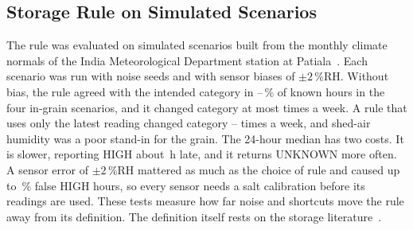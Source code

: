 \subsection{Storage Rule on Simulated Scenarios}
\label{sec:results-storage}

The rule was evaluated on  simulated scenarios built from the monthly climate normals of the India Meteorological
Department station at Patiala~\cite{imd2022}. Each scenario was run with  noise seeds and with sensor biases of
$\pm2$\,\%RH. Without bias, the rule agreed with the intended category in --\,\% of known
hours in the four in-grain scenarios, and it changed category at most  times a week. A rule that uses only the
latest reading changed category -- times a week, and shed-air humidity was a poor
stand-in for the grain. The 24-hour median has two costs. It is slower, reporting HIGH about \,h late, and it
returns UNKNOWN more often. A sensor error of $\pm2$\,\%RH mattered as much as the choice of rule and caused up to
\,\% false HIGH hours, so every sensor needs a salt calibration before its readings are used. These
tests measure how far noise and shortcuts move the rule away from its definition. The definition itself rests on the storage
literature~\cite{gwinner1996}\cite{delucia1994}.
